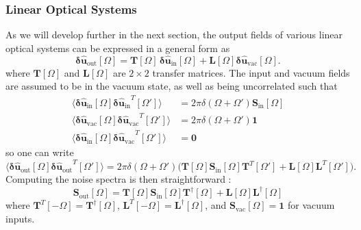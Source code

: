 \subsubsection{Linear Optical Systems}
As we will develop further in the next section, the output fields of various linear optical systems can be expressed in a general form as
\begin{equation}
\mathbf{\delta \hat{u}_{\mathrm{out}}}[\Omega]
=
\mathbf{T}[\Omega] \, \mathbf{\delta \hat{u}_{\mathrm{in}}}[\Omega]
+ \mathbf{L}[\Omega]  \mathbf{\delta \hat{u}_{\mathrm{vac}}}[\Omega].
\end{equation}
where $\mathbf{T}[\Omega]$ and $\mathbf{L}[\Omega]$ are $2\times 2$ transfer matrices. The input and vacuum fields are assumed to be in the vacuum state, as well as being uncorrelated such that 
\begin{equation}
  \begin{split}
    \langle \mathbf{\delta \hat{u}_{\mathrm{in}}}[\Omega]  \mathbf{\delta \hat{u}_{\mathrm{in}}}^{T}[\Omega'] \rangle & = 2\pi \delta(\Omega+\Omega')\mathbf{S}_{\mathrm{in}}[\Omega]  \\
    \langle \mathbf{\delta \hat{u}_{\mathrm{vac}}}[\Omega]  \mathbf{\delta \hat{u}_{\mathrm{vac}}}^{T}[\Omega'] \rangle &=  2\pi \delta(\Omega+\Omega')\mathbf{1}  \\
    \langle \mathbf{\delta \hat{u}_{\mathrm{in}}}[\Omega]  \mathbf{\delta \hat{u}_{\mathrm{vac}}}^{T}[\Omega'] \rangle &= \mathbf{0}
  \end{split}
\end{equation}
so one can write 
\begin{equation}
  \langle \mathbf{\delta \hat{u}_{\mathrm{out}}}[\Omega]  \mathbf{\delta \hat{u}_{\mathrm{out}}}^{T}[\Omega'] \rangle =2\pi \delta(\Omega+\Omega') \Big(\mathbf{T}[\Omega] \mathbf{S}_{\mathrm{in}}[\Omega] \mathbf{T}^{T}[\Omega'] + \mathbf{L}[\Omega] \mathbf{L}^{T}[\Omega']\Big).
\end{equation}
Computing the noise spectra is then straightforward : 
\begin{equation}
  \mathbf{S}_{\mathrm{out}}[\Omega] = \mathbf{T}[\Omega] \mathbf{S}_{\mathrm{in}}[\Omega] \mathbf{T}^{\dagger}[\Omega] + \mathbf{L}[\Omega] \mathbf{L}^{\dagger}[\Omega] 
\end{equation}
where $\mathbf{T}^{T}[-\Omega] = \mathbf{T}^{\dagger}[\Omega]$, $\mathbf{L}^{T}[-\Omega] = \mathbf{L}^{\dagger}[\Omega]$, and $\mathbf{S}_{\mathrm{vac}}[\Omega] = \mathbf{1}$ for vacuum inputs.\\




